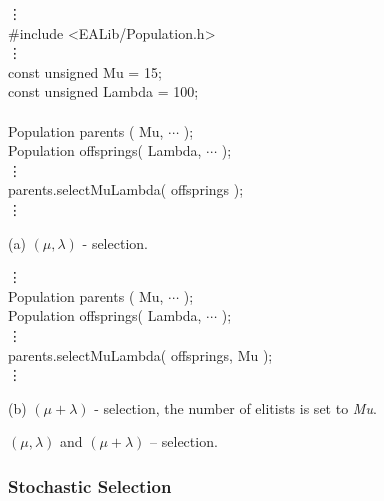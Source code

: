 \begin{example}[htb]
\begin{shortlisting}
            \vdots\\
\#include <EALib/Population.h>\\
            \vdots\\
const unsigned Mu     = 15;\\
const unsigned Lambda = 100;\\
\\
Population parents   ( Mu,     $\cdots$ );\\
Population offsprings( Lambda, $\cdots$ );\\
            \vdots\\
parents.selectMuLambda( offsprings );\\
            \vdots\\
\end{shortlisting}

(a) $(\mu,\lambda)$ - selection.

\begin{shortlisting}
            \vdots\\
Population parents   ( Mu,     $\cdots$ );\\
Population offsprings( Lambda, $\cdots$ );\\
            \vdots\\
parents.selectMuLambda( offsprings, Mu );\\
            \vdots\\
\end{shortlisting}

(b) $(\mu+\lambda)$ - selection, the number of elitists is set to {\em Mu}.

\caption[$(\mu,\lambda)$ and $(\mu+\lambda)$ -- Selection]{
    \label{selection:example:mu-lambda}
    $(\mu,\lambda)$ and $(\mu+\lambda)$ -- selection.
}
\end{example}


        \subsubsection{Stochastic Selection}

